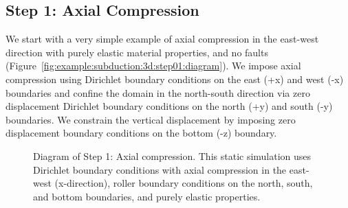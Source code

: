 \subsection{Step 1: Axial Compression}
\label{sec:example:subduction:3d:step01}

We start with a very simple example of axial compression in the
east-west direction with purely elastic material properties, and no
faults (Figure~\vref{fig:example:subduction:3d:step01:diagram}). We
impose axial compression using Dirichlet boundary conditions on the
east (+x) and west (-x) boundaries and confine the domain in the
north-south direction via zero displacement Dirichlet boundary
conditions on the north (+y) and south (-y) boundaries.  We constrain
the vertical displacement by imposing zero displacement boundary
conditions on the bottom (-z) boundary.

\begin{figure}[htbp]
  \caption{Diagram of Step 1: Axial compression. This static
    simulation uses Dirichlet boundary conditions with axial
    compression in the east-west (x-direction), roller boundary
    conditions on the north, south, and bottom boundaries, and purely
    elastic properties.}
  \label{fig:example:subduction:3d:step01:diagram}
\end{figure}

